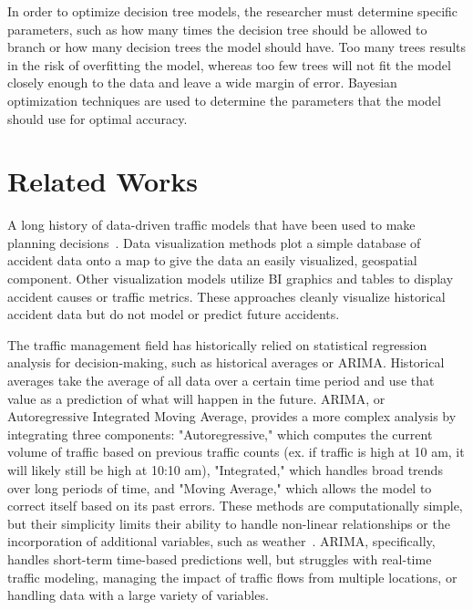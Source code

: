 \documentclass[12pt]{article}
\begin{document}
In order to optimize decision tree models, the researcher must determine specific parameters, such as how many times the decision tree should be 
allowed to branch or how many decision trees the model should have. Too many trees results in the risk of overfitting the model, whereas
too few trees will not fit the model closely enough to the data and leave a wide margin of error. 
Bayesian optimization techniques are used to determine the parameters that the model should use for optimal accuracy.

\section{Related Works}
A long history of data-driven traffic models that have been used to make planning decisions~\cite{AHMED2023100814, 9798574, 11137940}. 
Data visualization methods plot a simple database of
accident data onto a map to give the data an easily visualized, geospatial component. Other visualization models utilize BI graphics and tables to display
accident causes or traffic metrics. These approaches cleanly visualize historical accident data
but do not model or predict future accidents.

The traffic management field has historically relied on statistical regression analysis for decision-making, 
such as historical averages or ARIMA. Historical averages take the average of all data over a certain time period and use that
value as a prediction of what will happen in the future. ARIMA, or Autoregressive Integrated Moving Average, provides a more complex
analysis by integrating three components: "Autoregressive," which computes the current volume of traffic based on previous traffic counts
(ex. if traffic is high at 10 am, it will likely still be high at 10:10 am),
"Integrated," which handles broad trends over long periods of time, and "Moving Average," which allows the model to correct itself
based on its past errors. These methods are computationally simple, but their simplicity
limits their ability to handle non-linear relationships or the incorporation of additional variables, such as weather~\cite{app15073866}. 
ARIMA, specifically, handles short-term time-based predictions well, but struggles with real-time traffic modeling, managing
the impact of traffic flows from multiple locations, or handling data with a large variety of variables. 
\end{document}
